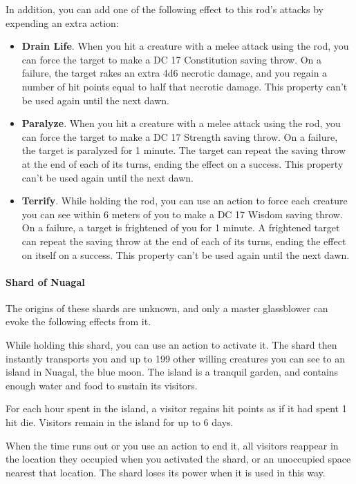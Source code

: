         In addition, you can add one of the following effect to this rod's attacks by expending an extra action:
        \begin{itemize}
            \item \textbf{Drain Life}.
            When you hit a creature with a melee attack using the rod, you can force the target to make a DC 17 Constitution saving throw.
            On a failure, the target rakes an extra 4d6 necrotic damage, and you regain a number of hit points equal to half that necrotic damage.
            This property can't be used again until the next dawn.
            \item \textbf{Paralyze}.
            When you hit a creature with a melee attack using the rod, you can force the target to make a DC 17 Strength saving throw.
            On a failure, the target is paralyzed for 1 minute.
            The target can repeat the saving throw at the end of each of its turns, ending the effect on a success.
            This property can't be used again until the next dawn.
            \item \textbf{Terrify}.
            While holding the rod, you can use an action to force each creature you can see within 6 meters of you to make a DC 17 Wisdom saving throw.
            On a failure, a target is frightened of you for 1 minute.
            A frightened target can repeat the saving throw at the end of each of its turns, ending the effect on itself on a success.
            This property can't be used again until the next dawn.
        \end{itemize}
    \paragraph{Shard of Nuagal}
        The origins of these shards are unknown, and only a master glassblower can evoke the following effects from it.

        While holding this shard, you can use an action to activate it.
        The shard then instantly transports you and up to 199 other willing creatures you can see to an island in Nuagal, the blue moon.
        The island is a tranquil garden, and contains enough water and food to sustain its visitors.

        For each hour spent in the island, a visitor regains hit points as if it had spent 1 hit die.
        Visitors remain in the island for up to 6 days.

        When the time runs out or you use an action to end it, all visitors reappear in the location they occupied when you activated the shard, or an unoccupied space nearest that location.
        The shard loses its power when it is used in this way.
